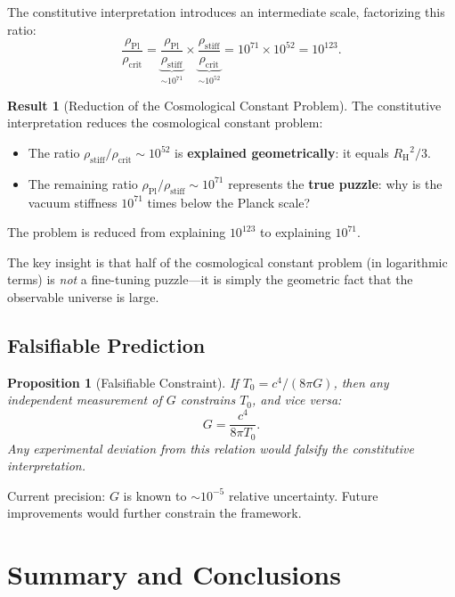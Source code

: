 \documentclass[11pt,a4paper]{article}
\newcommand{\rhocrit}{\ensuremath{\rho_{\mathrm{crit}}}}
\newcommand{\rhostiff}{\ensuremath{\rho_{\mathrm{stiff}}}}
\newcommand{\rhoPl}{\ensuremath{\rho_{\mathrm{Pl}}}}
\newcommand{\Tzero}{\ensuremath{T_0}}
\newcommand{\RH}{\ensuremath{R_{\mathrm{H}}}}
\newtheorem{proposition}{Proposition}
\theoremstyle{definition}
\newtheorem{result}{Result}
\begin{document}
The constitutive interpretation introduces an intermediate scale, factorizing this ratio:
\begin{equation}
\frac{\rhoPl}{\rhocrit} = \underbrace{\frac{\rhoPl}{\rhostiff}}_{\sim 10^{71}} \times \underbrace{\frac{\rhostiff}{\rhocrit}}_{\sim 10^{52}} = 10^{71} \times 10^{52} = 10^{123}.
\end{equation}

\begin{result}[Reduction of the Cosmological Constant Problem]
The constitutive interpretation reduces the cosmological constant problem:
\begin{itemize}
    \item The ratio $\rhostiff/\rhocrit \sim 10^{52}$ is \textbf{explained geometrically}: it equals $\RH^2/3$.
    \item The remaining ratio $\rhoPl/\rhostiff \sim 10^{71}$ represents the \textbf{true puzzle}: why is the vacuum stiffness $10^{71}$ times below the Planck scale?
\end{itemize}
The problem is reduced from explaining $10^{123}$ to explaining $10^{71}$.
\end{result}

The key insight is that half of the cosmological constant problem (in logarithmic terms) is \emph{not} a fine-tuning puzzle---it is simply the geometric fact that the observable universe is large.

\subsection{Falsifiable Prediction}
\label{sec:falsifiable}

\begin{proposition}[Falsifiable Constraint]
If $\Tzero = c^4/(8\pi G)$, then any independent measurement of $G$ constrains $\Tzero$, and vice versa:
\begin{equation}
\boxed{G = \frac{c^4}{8\pi \Tzero}.}
\end{equation}
Any experimental deviation from this relation would falsify the constitutive interpretation.
\end{proposition}

Current precision: $G$ is known to $\sim 10^{-5}$ relative uncertainty. Future improvements would further constrain the framework.

\section{Summary and Conclusions}
\label{sec:conclusions}
\end{document}
